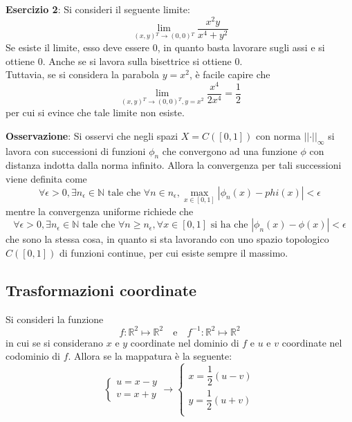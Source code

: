 \documentclass[a4paper]{extarticle}
\begin{document}
\vspace{1em}
\noindent
\textbf{Esercizio 2}: Si consideri il seguente limite:
\[\lim_{(x,y){^T} \to (0,0){^T}} \frac{x^2y}{x^4+y^2}\]
Se esiste il limite, esso deve essere $0$, in quanto basta lavorare sugli assi e si ottiene $0$. Anche se si lavora sulla bisettrice si ottiene $0$.\\
Tuttavia, se si considera la parabola $y=x^2$, è facile capire che
\[\lim_{(x,y){^T} \to (0,0){^T},y=x^2} \frac{x^4}{2x^4}=\frac{1}{2}\]
per cui si evince che tale limite non esiste.

\vspace{1em}
\noindent
\textbf{Osservazione}: Si osservi che negli spazi $X=C([0,1])$ con norma $\vert \vert \cdot \vert \vert_\infty$ si lavora con successioni di funzioni $\phi_n$ che convergono ad una funzione $\phi$ con distanza indotta dalla norma infinito. Allora la convergenza per tali successioni viene definita come
\[\forall \epsilon > 0, \exists n_\epsilon \in \mathbb{N} \text{ tale che } \forall n \in n_\epsilon, \underset{x \in [0,1]}{\max} \left \vert \phi_n(x) - phi(x) \right \vert < \epsilon\]
mentre la convergenza uniforme richiede che
\[\forall \epsilon > 0, \exists n_\epsilon \in \mathbb{N} \text{ tale che } \forall n \geq n_\epsilon, \forall x \in [0,1] \text{ si ha che } \left \vert \phi_n(x) - \phi(x) \right \vert < \epsilon\]
che sono la stessa cosa, in quanto si sta lavorando con uno spazio topologico $C([0,1])$ di funzioni continue, per cui esiste sempre il massimo.

\vspace{1em}
\noindent
\subsection{Trasformazioni coordinate}
Si consideri la funzione
\[f : \mathbb{R}^2 \longmapsto \mathbb{R}^2 \hspace{1em} \text{e} \hspace{1em} f^{-1} : \mathbb{R}^2 \longmapsto \mathbb{R}^2\]
in cui se si considerano $x$ e $y$ coordinate nel dominio di $f$ e $u$ e $v$ coordinate nel codominio di $f$. Allora se la mappatura è la seguente:
\[
    \left\{
    \begin{array}{l}
        u=x-y\\
        v=x+y
    \end{array}  
    \right.
    \rightarrow
    \left\{
    \begin{array}{l}
        x=\dfrac{1}{2} (u-v)\\
        y=\dfrac{1}{2} (u+v)\\
    \end{array}  
    \right.
\]
\end{document}
